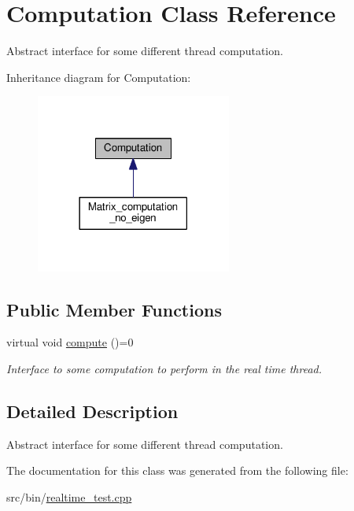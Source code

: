 \hypertarget{classComputation}{}\section{Computation Class Reference}
\label{classComputation}


Abstract interface for some different thread computation.  




Inheritance diagram for Computation\+:
\nopagebreak
\begin{figure}[H]
\begin{center}
\leavevmode
\includegraphics[width=182pt]{classComputation__inherit__graph}
\end{center}
\end{figure}
\subsection*{Public Member Functions}
\begin{DoxyCompactItemize}
\item 
virtual void \hyperlink{classComputation_a1b2d101b74dadde0624f837a62c051c6}{compute} ()=0\hypertarget{classComputation_a1b2d101b74dadde0624f837a62c051c6}{}\label{classComputation_a1b2d101b74dadde0624f837a62c051c6}

\begin{DoxyCompactList}\small\item\em Interface to some computation to perform in the real time thread. \end{DoxyCompactList}\end{DoxyCompactItemize}


\subsection{Detailed Description}
Abstract interface for some different thread computation. 

The documentation for this class was generated from the following file\+:\begin{DoxyCompactItemize}
\item 
src/bin/\hyperlink{realtime__test_8cpp}{realtime\+\_\+test.\+cpp}\end{DoxyCompactItemize}
